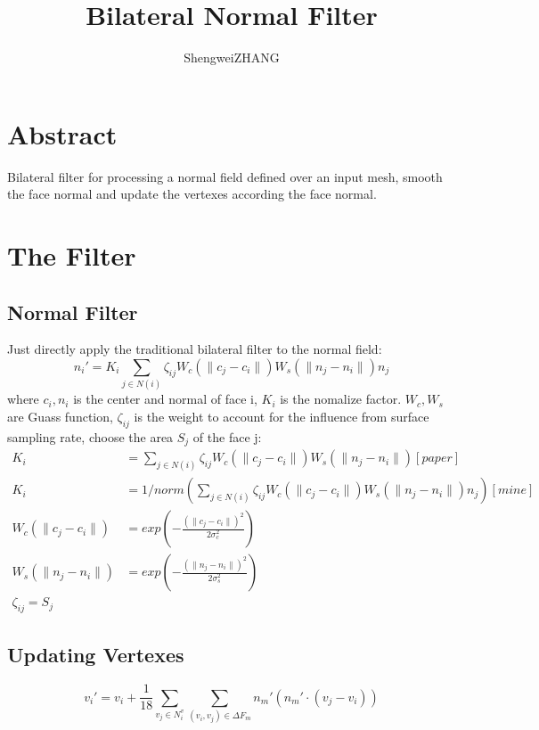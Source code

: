 \documentclass{article}
\title{Bilateral Normal Filter}
\author{ShengweiZHANG\\
}
\theoremstyle{definition}
\theoremstyle{remark}
\begin{document}
\maketitle

\section{Abstract}
Bilateral filter for processing a normal field defined over an input mesh, smooth the face normal and update the vertexes according the face normal.
\section{The Filter}
\subsection{Normal Filter}
Just directly apply the traditional bilateral filter to the normal field:
\begin{equation}
  n_i' = K_i \sum_{j\in N(i)} \zeta_{ij} W_c(\parallel c_j-c_i\parallel) W_s(\parallel n_j - n_i \parallel) n_j
\end{equation}
where $c_i, n_i$  is the center and normal of face i, $K_i$ is the nomalize factor. $W_c, W_s$ are Guass function, $\zeta_{ij}$ is the weight to account for the influence from surface sampling rate, choose the area $S_j$ of the face j:
\begin{equation}
  \begin{aligned}
    K_i &= \sum_{j\in N(i)} \zeta_{ij} W_c(\parallel c_j-c_i\parallel) W_s(\parallel n_j - n_i \parallel)  [paper]\\
    K_i &= 1/norm(\sum_{j\in N(i)} \zeta_{ij} W_c(\parallel c_j-c_i\parallel) W_s(\parallel n_j - n_i \parallel) n_j) [mine] \\
    W_c(\parallel c_j-c_i \parallel) &= exp(-\frac{(\parallel c_j-c_i \parallel)^2}{2\sigma_c^2})\\
    W_s(\parallel n_j-n_i \parallel) &= exp(-\frac{(\parallel n_j-n_i \parallel)^2} {2\sigma_s^2})\\
    \zeta_{ij} = S_j
  \end{aligned}
\end{equation}
\subsection{Updating Vertexes}
\begin{equation}
  v_i' = v_i + \frac{1}{18} \sum_{v_j \in N_i^v} \sum_{ (v_i, v_j) \in \Delta F_m} n_m'(n_m' \cdot (v_j - v_i))
\end{equation}
\end{document}

